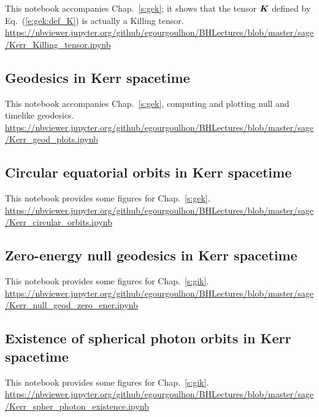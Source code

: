 This notebook accompanies Chap.~\ref{s:gek}; it shows that the
tensor $\bm{K}$ defined by Eq.~(\ref{e:gek:def_K}) is actually a Killing tensor.\\[1ex]
{\footnotesize
\url{https://nbviewer.jupyter.org/github/egourgoulhon/BHLectures/blob/master/sage/Kerr_Killing_tensor.ipynb}
}


\subsection{Geodesics in Kerr spacetime} \label{s:sam:Kerr_geod_plots}

This notebook accompanies Chap.~\ref{s:gek}, computing and plotting null and timelike geodesics.\\[1ex]
{\footnotesize
\url{https://nbviewer.jupyter.org/github/egourgoulhon/BHLectures/blob/master/sage/Kerr_geod_plots.ipynb}
}

\subsection{Circular equatorial orbits in Kerr spacetime} \label{s:sam:Kerr_circular_orbits}

This notebook provides some figures for Chap.~\ref{s:gek}.\\[1ex]
{\footnotesize
\url{https://nbviewer.jupyter.org/github/egourgoulhon/BHLectures/blob/master/sage/Kerr_circular_orbits.ipynb}
}

\subsection{Zero-energy null geodesics in Kerr spacetime} \label{s:sam:Kerr_null_geod_zero_ener}

This notebook provides some figures for Chap.~\ref{s:gik}.\\[1ex]
{\footnotesize
\url{https://nbviewer.jupyter.org/github/egourgoulhon/BHLectures/blob/master/sage/Kerr_null_geod_zero_ener.ipynb}
}

\subsection{Existence of spherical photon orbits in Kerr spacetime} \label{s:sam:Kerr_spher_photon_existence}

This notebook provides some figures for Chap.~\ref{s:gik}.\\[1ex]
{\footnotesize
\url{https://nbviewer.jupyter.org/github/egourgoulhon/BHLectures/blob/master/sage/Kerr_spher_photon_existence.ipynb}
}



